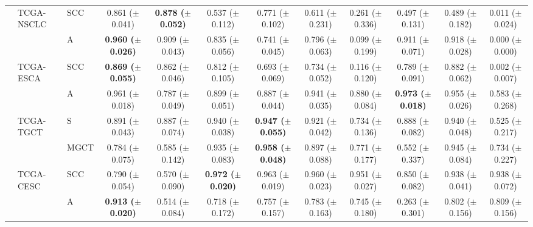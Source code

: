 \documentclass[10pt,twocolumn,letterpaper]{article}
\begin{document}
\begin{table}[!ht]
{{\begin{tabular}{lllccccccccc}
                & TCGA-NSCLC       & SCC          & 0.861 ($\pm$0.041)           & \textbf{0.878 ($\pm$0.052)}  & 0.537 ($\pm$0.112)          & 0.771 ($\pm$0.102)          & 0.611 ($\pm$0.231)          & 0.261 ($\pm$0.336)  & 0.497 ($\pm$0.131)          & 0.489 ($\pm$0.182)  & 0.011 ($\pm$0.024)    \\
                &                  & A                   & \textbf{0.960 ($\pm$0.026)}  & 0.909 ($\pm$0.043)           & 0.835 ($\pm$0.056)          & 0.741 ($\pm$0.045)          & 0.796 ($\pm$0.063)          & 0.099 ($\pm$0.199)  & 0.911 ($\pm$0.071)          & 0.918 ($\pm$0.028)  & 0.000 ($\pm$0.000)    \\
                & TCGA-ESCA        & SCC          & \textbf{0.869 ($\pm$0.055)}  & 0.862 ($\pm$0.046)           & 0.812 ($\pm$0.105)          & 0.693 ($\pm$0.069)          & 0.734 ($\pm$0.052)          & 0.116 ($\pm$0.120)  & 0.789 ($\pm$0.091)          & 0.882 ($\pm$0.062)  & 0.002 ($\pm$0.007)    \\
                &                  & A                   & 0.961 ($\pm$0.018)           & 0.787 ($\pm$0.049)           & 0.899 ($\pm$0.051)          & 0.887 ($\pm$0.044)          & 0.941 ($\pm$0.035)          & 0.880 ($\pm$0.084)  & \textbf{0.973 ($\pm$0.018)} & 0.955 ($\pm$0.026)  & 0.583 ($\pm$0.268)    \\
                & TCGA-TGCT        & S & 0.891 ($\pm$0.043)           & 0.887 ($\pm$0.074)           & 0.940 ($\pm$0.038)          & \textbf{0.947 ($\pm$0.055)} & 0.921 ($\pm$0.042)          & 0.734 ($\pm$0.136)  & 0.888 ($\pm$0.082)          & 0.940 ($\pm$0.048)  & 0.525 ($\pm$0.217)    \\
                &                  & MGCT            & 0.784 ($\pm$0.075)           & 0.585 ($\pm$0.142)           & 0.935 ($\pm$0.083)          & \textbf{0.958 ($\pm$0.048)} & 0.897 ($\pm$0.088)          & 0.771 ($\pm$0.177)  & 0.552 ($\pm$0.337)          & 0.945 ($\pm$0.084)  & 0.734 ($\pm$0.227)    \\
                & TCGA-CESC        & SCC          & 0.790 ($\pm$0.054)           & 0.570 ($\pm$0.090)           & \textbf{0.972 ($\pm$0.020)} & 0.963 ($\pm$0.019)          & 0.960 ($\pm$0.023)          & 0.951 ($\pm$0.027)  & 0.850 ($\pm$0.082)          & 0.938 ($\pm$0.041)  & 0.938 ($\pm$0.072)    \\
                &                  & A                   & \textbf{0.913 ($\pm$0.020)}  & 0.514 ($\pm$0.084)           & 0.718 ($\pm$0.172)          & 0.757 ($\pm$0.157)          & 0.783 ($\pm$0.163)          & 0.745 ($\pm$0.180)  & 0.263 ($\pm$0.301)          & 0.802 ($\pm$0.156)  & 0.809 ($\pm$0.156)    \\ \midrule\midrule

\end{tabular}}}
\end{table}
\end{document}
